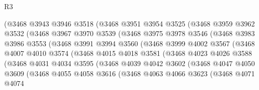\begin{lexlean}{R3}
\begin{coremodule}
                (@3468
                  @3943
                  @3946
                  @3518
                  (@3468
                    @3951
                    @3954
                    @3525
                    (@3468
                      @3959
                      @3962
                      @3532
                      (@3468
                        @3967
                        @3970
                        @3539
                        (@3468
                          @3975
                          @3978
                          @3546
                          (@3468
                            @3983
                            @3986
                            @3553
                            (@3468
                              @3991
                              @3994
                              @3560
                              (@3468
                                @3999
                                @4002
                                @3567
                                (@3468
                                  @4007
                                  @4010
                                  @3574
                                  (@3468
                                    @4015
                                    @4018
                                    @3581
                                    (@3468
                                      @4023
                                      @4026
                                      @3588
                                      (@3468
                                        @4031
                                        @4034
                                        @3595
                                        (@3468
                                          @4039
                                          @4042
                                          @3602
                                          (@3468
                                            @4047
                                            @4050
                                            @3609
                                            (@3468
                                              @4055
                                              @4058
                                              @3616
                                              (@3468
                                                @4063
                                                @4066
                                                @3623
                                                (@3468
                                                  @4071
                                                  @4074

\end{coremodule}
\end{lexlean}
